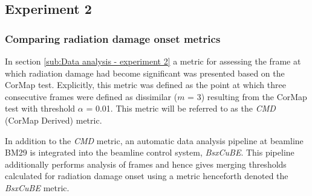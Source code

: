 \subsection{Experiment 2}
\label{sub:Experiment 2 - Results}

\subsubsection{Comparing radiation damage onset metrics}
\label{subs:Comparing radiation damage onset metrics}
In section \ref{sub:Data analysis - experiment 2} a metric for assessing the frame at which radiation damage had become significant was presented based on the CorMap test.
Explicitly, this metric was defined as the point at which three consecutive frames were defined as dissimilar ($m$ = 3) resulting from the CorMap test with threshold $\alpha$ = 0.01.
This metric will be referred to as the \textit{CMD} (CorMap Derived) metric.

In addition to the \textit{CMD} metric, an automatic data analysis pipeline at beamline BM29 \cite{brennich2016online} is integrated into the beamline control system, \textit{BsxCuBE}.
This pipeline additionally performs analysis of frames and hence gives merging thresholds calculated for radiation damage onset using a metric henceforth denoted the \textit{BsxCuBE} metric.

